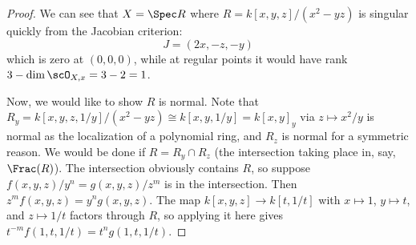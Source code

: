 \begin{proof}
	We can see that $X = \Spec R$ where $R = k[x,y,z]/(x^2-yz)$ is singular quickly from the Jacobian criterion:
	\[ J = (2x, -z, -y) \]
	which is zero at $(0,0,0)$, while at regular points it would have rank $3-\dim\scO_{X,x} = 3-2 = 1$.
	
	Now, we would like to show $R$ is normal. Note that $R_y = k[x,y,z,1/y]/(x^2-yz) \cong k[x,y,1/y] = k[x,y]_y$ via $z \mapsto x^2/y$ is normal as the localization of a polynomial ring, and $R_z$ is normal for a symmetric reason. We would be done if $R = R_y \cap R_z$ (the intersection taking place in, say, $\Frac(R)$). The intersection obviously contains $R$, so suppose $f(x,y,z)/y^n = g(x,y,z)/z^m$ is in the intersection. Then $z^mf(x,y,z) = y^ng(x,y,z)$. The map $k[x,y,z] \to k[t,1/t]$ with $x \mapsto 1$, $y \mapsto t$, and $z \mapsto 1/t$ factors through $R$, so applying it here gives $t^{-m}f(1,t,1/t) = t^ng(1,t,1/t)$. 
\end{proof}
